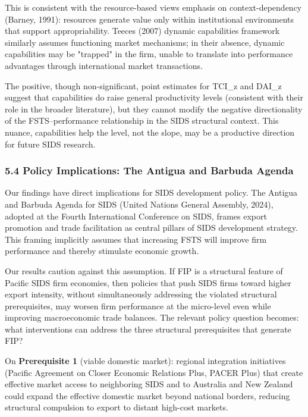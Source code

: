 \documentclass[12pt,a4paper]{article}
\begin{document}
This is consistent with the resource-based view\textquotesingle s
emphasis on context-dependency (Barney, 1991): resources generate value
only within institutional environments that support appropriability.
Teece\textquotesingle s (2007) dynamic capabilities framework similarly
assumes functioning market mechanisms; in their absence, dynamic
capabilities may be "trapped" in the firm, unable to translate into
performance advantages through international market transactions.

The positive, though non-significant, point estimates for TCI\_z and
DAI\_z suggest that capabilities do raise general productivity levels
(consistent with their role in the broader literature), but they cannot
modify the negative directionality of the FSTS--performance relationship
in the SIDS structural context. This nuance, capabilities help the
level, not the slope, may be a productive direction for future SIDS
research.

\hypertarget{54-policy-implications-the-antigua-and-barbuda-agenda}{%
\subsubsection{5.4 Policy Implications: The Antigua and Barbuda
Agenda}\label{54-policy-implications-the-antigua-and-barbuda-agenda}}

Our findings have direct implications for SIDS development policy. The
Antigua and Barbuda Agenda for SIDS (United Nations General Assembly,
2024), adopted at the Fourth International Conference on SIDS, frames
export promotion and trade facilitation as central pillars of SIDS
development strategy. This framing implicitly assumes that increasing
FSTS will improve firm performance and thereby stimulate economic
growth.

Our results caution against this assumption. If FIP is a structural
feature of Pacific SIDS firm economies, then policies that push SIDS
firms toward higher export intensity, without simultaneously addressing
the violated structural prerequisites, may worsen firm performance at
the micro-level even while improving macroeconomic trade balances. The
relevant policy question becomes: what interventions can address the
three structural prerequisites that generate FIP?

On \textbf{Prerequisite 1} (viable domestic market): regional
integration initiatives (Pacific Agreement on Closer Economic Relations
Plus, PACER Plus) that create effective market access to neighboring
SIDS and to Australia and New Zealand could expand the effective
domestic market beyond national borders, reducing structural compulsion
to export to distant high-cost markets.
\end{document}

